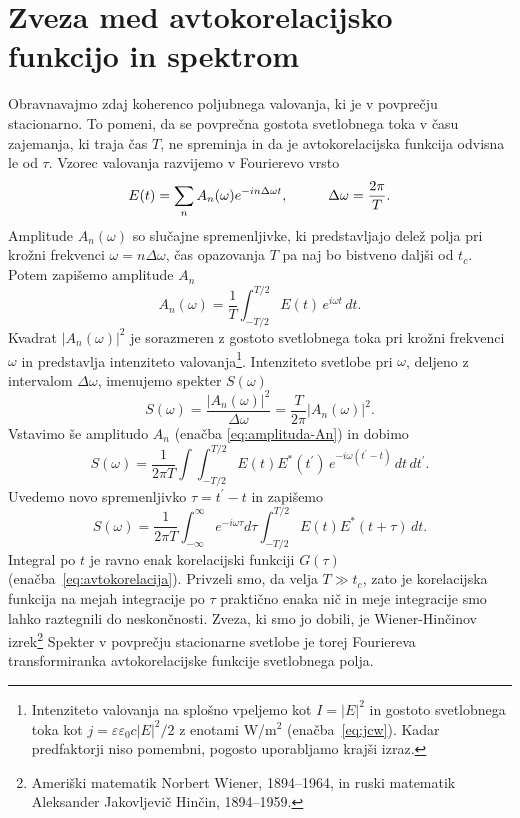 \section{Zveza med avtokorelacijsko funkcijo in spektrom}

Obravnavajmo zdaj koherenco poljubnega valovanja, ki
je v povprečju stacionarno. To pomeni, da se povprečna gostota svetlobnega
toka v času zajemanja, ki traja čas $T$, ne spreminja in da je avtokorelacijska funkcija
odvisna le od $\tau$. Vzorec valovanja razvijemo
v Fourierevo vrsto
\begin{equation}
E(t)=\sum_{n}A_{n}(\omega)e^{-i n \Delta\omega t},\mbox{\hskip1cm}\Delta\omega=\frac{2\pi}{T}.
\end{equation}
Amplitude $A_{n}(\omega)$ so slučajne spremenljivke, ki predstavljajo delež polja pri 
krožni frekvenci $\omega=n\Delta\omega$, čas opazovanja $T$ pa naj bo bistveno daljši od $t_{c}$. 
Potem zapišemo amplitude $A_n$
\begin{equation}
A_{n}(\omega)=\frac{1}{T}\int_{-T/2}^{T/2}E(t)\, e^{i\omega t}\, dt.\label{eq:amplituda-An}
\end{equation}
Kvadrat $|A_{n}(\omega)|^{2}$ je sorazmeren z gostoto svetlobnega toka pri krožni
frekvenci $\omega$ in predstavlja intenziteto
valovanja\footnote{Intenziteto valovanja na splošno vpeljemo kot $I = |E|^2$ in gostoto svetlobnega
toka kot $j = \varepsilon \varepsilon_0 c |E|^2/2$ z enotami W/m$^2$ (enačba~\ref{eq:jcw}). 
Kadar predfaktorji niso pomembni, pogosto uporabljamo krajši izraz.}. 
Intenziteto svetlobe pri $\omega$, deljeno z intervalom $\Delta\omega$, imenujemo  
spekter $S(\omega)$
\begin{equation}
S(\omega)=\frac{|A_{n}(\omega)|^{2}}{\Delta\omega}=\frac{T}{2\pi}|A_{n}(\omega)|^{2}.
\end{equation}
Vstavimo še amplitudo $A_{n}$ (enačba \ref{eq:amplituda-An}) in dobimo 
\begin{equation}
S(\omega) =\frac{1}{2\pi T}\int\int_{-T/2}^{T/2}E(t)E^{*}(t^{\prime})\, 
e^{-i\omega(t^{\prime}-t)}\, dt\, dt^{\prime}.
\end{equation}
Uvedemo novo spremenljivko $\tau=t^{\prime}-t$ in zapišemo
\begin{equation}
S(\omega)=\frac{1}{2\pi T}\int_{-\infty}^{\infty}e^{-i\omega\tau}d\tau\int_{-T/2}^{T/2}E(t)E^{*}(t+\tau)\, dt.
\label{eq:spekter}
\end{equation}
Integral po $t$ je ravno enak korelacijski funkciji $G(\tau)$ 
(enačba~\ref{eq:avtokorelacija}). Privzeli smo, da velja $T\gg t_{c}$, zato 
je korelacijska funkcija na mejah integracije po $\tau$ praktično enaka nič in 
meje integracije smo lahko raztegnili do neskončnosti. Zveza, ki smo jo dobili, je 
Wiener-Hinčinov izrek\footnote{Ameriški matematik Norbert Wiener, 1894--1964, in 
ruski matematik Aleksander Jakovljevič Hinčin, 1894--1959.}
Spekter v povprečju stacionarne svetlobe je torej Fouriereva transformiranka 
avtokorelacijske funkcije svetlobnega polja. 

